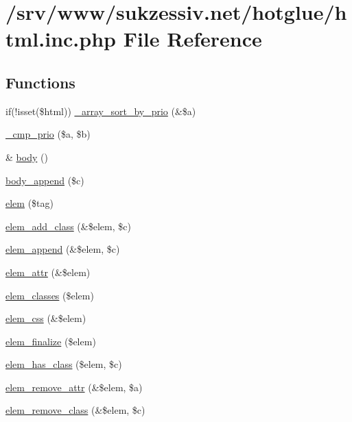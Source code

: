 \hypertarget{html_8inc_8php}{
\section{/srv/www/sukzessiv.net/hotglue/html.inc.php File Reference}
\label{html_8inc_8php}
}
\subsection*{Functions}
\begin{DoxyCompactItemize}
\item 
if(!isset(\$html)) \hyperlink{html_8inc_8php_a7fb2b386b2bae219112628971275c225}{\_\-array\_\-sort\_\-by\_\-prio} (\&\$a)
\item 
\hyperlink{html_8inc_8php_af8ecadff0a4b78867d4da5eae49615e1}{\_\-cmp\_\-prio} (\$a, \$b)
\item 
\& \hyperlink{html_8inc_8php_a8b842636055e9a5853a7a10a9e002330}{body} ()
\item 
\hyperlink{html_8inc_8php_ad27881abf3a2004d287434d8c8d7cdf6}{body\_\-append} (\$c)
\item 
\hyperlink{html_8inc_8php_aa7a1256f84f937f1656195d5ce7b8d91}{elem} (\$tag)
\item 
\hyperlink{html_8inc_8php_aafa12d2b690751666e599fb052e19ca6}{elem\_\-add\_\-class} (\&\$elem, \$c)
\item 
\hyperlink{html_8inc_8php_aea37c451f5d55e2efbb2656e340c1dae}{elem\_\-append} (\&\$elem, \$c)
\item 
\hyperlink{html_8inc_8php_a894dc22f3b7668c59364599909162b8e}{elem\_\-attr} (\&\$elem)
\item 
\hyperlink{html_8inc_8php_a821651b8923938645b0b0fa6bb084522}{elem\_\-classes} (\$elem)
\item 
\hyperlink{html_8inc_8php_ac705ef06deb9e2d49e342ed78ecc1c9a}{elem\_\-css} (\&\$elem)
\item 
\hyperlink{html_8inc_8php_af04b43a4dd09e73ca2cef84a4f2e9381}{elem\_\-finalize} (\$elem)
\item 
\hyperlink{html_8inc_8php_ab1019c4b75181c1c1af10e1c1e5e197d}{elem\_\-has\_\-class} (\$elem, \$c)
\item 
\hyperlink{html_8inc_8php_aeb7074172d9164f69e64967b6bcdc643}{elem\_\-remove\_\-attr} (\&\$elem, \$a)
\item 
\hyperlink{html_8inc_8php_a6a224914e8f32176ca11a31154b1ae13}{elem\_\-remove\_\-class} (\&\$elem, \$c)
\item 

\end{DoxyCompactItemize}

